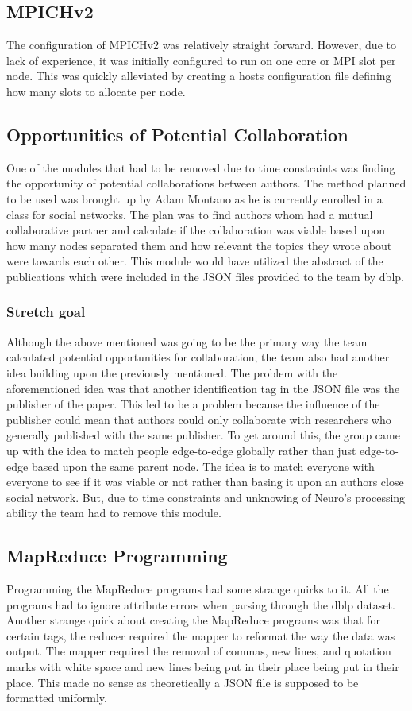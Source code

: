 \documentclass[10pt,journal,compsoc]{IEEEtran}
\begin{document}
\subsection{MPICHv2}
The configuration of MPICHv2 was relatively straight forward. However, due to lack of experience, it was initially configured to run on one core or MPI slot per node. This was quickly alleviated by creating a hosts configuration file defining how many slots to allocate per node.

\subsection{Opportunities of Potential Collaboration}
One of the modules that had to be removed due to time constraints was finding the opportunity of potential collaborations between authors. The method planned to be used was brought up by Adam Montano as he is currently enrolled in a class for social networks. The plan was to find authors whom had a mutual collaborative partner and calculate if the collaboration was viable based upon how many nodes separated them and how relevant the topics they wrote about were towards each other. This module would have utilized the abstract of the publications which were included in the JSON files provided to the team by dblp. 

\subsubsection{Stretch goal}
Although the above mentioned was going to be the primary way the team calculated potential opportunities for collaboration, the team also had another idea building upon the previously mentioned. The problem with the aforementioned idea was that another identification tag in the JSON file was the publisher of the paper. This led to be a problem because the influence of the publisher could mean that authors could only collaborate with researchers who generally published with the same publisher. To get around this, the group came up with the idea to match people edge-to-edge globally rather than just edge-to-edge based upon the same parent node. The idea is to match everyone with everyone to see if it was viable or not rather than basing it upon an authors close social network. But, due to time constraints and unknowing of Neuro's processing ability the team had to remove this module.

\subsection{MapReduce Programming}
Programming the MapReduce programs had some strange quirks to it. All the programs had to ignore attribute errors when parsing through the dblp dataset. Another strange quirk about creating the MapReduce programs was that for certain tags, the reducer required the mapper to reformat the way the data was output. The mapper required the removal of commas, new lines, and quotation marks with white space and new lines being put in their place being put in their place. This made no sense as theoretically a JSON file is supposed to be formatted uniformly.
\end{document}
